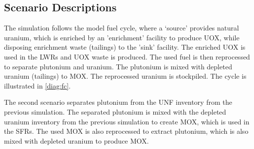 \subsection{Scenario Descriptions}
The simulation follows the model fuel cycle, where a `source'
provides natural uranium, which is enriched by an 'enrichment'
facility to produce \gls{UOX}, while disposing enrichment waste (tailings)
to the 'sink' facility. The enriched \gls{UOX} is used
in the \gls{LWR}s and \gls{UOX} waste is produced. The used fuel
is then reprocessed to separate plutonium and uranium.
The plutonium is mixed with depleted uranium (tailings) to \gls{MOX}.
The reprocessed uranium is stockpiled. The cycle is illustrated in
\cref{diag:fc}.

The second scenario separates plutonium from the \gls{UNF}
inventory from the previous simulation. The separated
plutonium is mixed with the depleted uranium inventory from the previous simulation
to create \gls{MOX}, which is used in the \gls{SFR}s. The used
\gls{MOX} is also reprocessed to extract plutonium, which is also
mixed with depleted uranium to produce \gls{MOX}.

